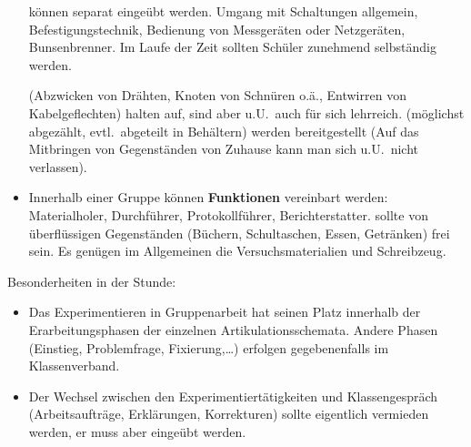 \begin{itemize}
\begin{itemize}
	\end{itemize}
	
	 k\"{o}nnen separat einge\"{u}bt werden.
	Umgang mit Schaltungen allgemein, Befestigungstechnik,
	Bedienung von Messger\"{a}ten oder Netzger\"{a}ten, Bunsenbrenner.
	Im Laufe der Zeit sollten Sch\"{u}ler zunehmend selbst\"{a}ndig werden.
	
	 (Abzwicken von Dr\"{a}hten,
	Knoten von Schn\"{u}ren o.\"{a}., Entwirren von Kabelgeflechten)
	halten auf, sind aber u.U.\ auch f\"{u}r sich lehrreich.
	 (m\"{o}glichst abgez\"{a}hlt, evtl.\ abgeteilt in Beh\"{a}ltern)
	werden bereitgestellt
	(Auf das Mitbringen von Gegenst\"{a}nden von Zuhause kann man sich u.U.\
	nicht verlassen).
	\item
	Innerhalb einer Gruppe k\"{o}nnen \textbf{Funktionen} vereinbart werden:
	Materialholer, Durchf\"{u}hrer, Protokollf\"{u}hrer, Berichterstatter.
	\bitem{Arbeitsplatz} sollte von \"{u}berfl\"{u}ssigen Gegenst\"{a}nden (B\"{u}chern,
	Schultaschen, Essen, Getr\"{a}nken) frei sein.
	Es gen\"{u}gen im Allgemeinen die Versuchsmaterialien und Schreibzeug.
\end{itemize}
	
Besonderheiten in der Stunde:
\begin{itemize}
	\item
	Das Experimentieren in Gruppenarbeit hat seinen Platz innerhalb der
	Erarbeitungsphasen der einzelnen Artikulationsschemata.
	Andere Phasen (Einstieg, Problemfrage, Fixierung,\dots)
	erfolgen gegebenenfalls im Klassenverband.
	\item
	Der Wechsel zwischen den Experimentiert\"{a}tigkeiten und
	Klassengespr\"{a}ch (Arbeitsauftr\"{a}ge, Erkl\"{a}rungen, Korrekturen)
	sollte eigentlich vermieden werden,
	er muss aber einge\"{u}bt werden.
\end{itemize}

\bip\bip
